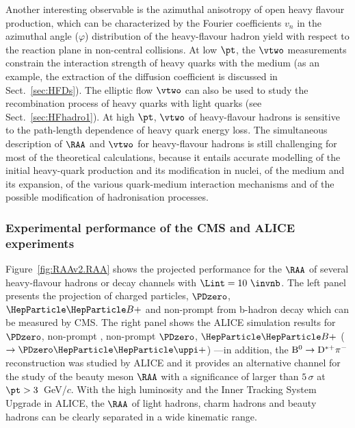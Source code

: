 Another interesting observable is the azimuthal anisotropy of open heavy flavour production, which can be characterized by the Fourier coefficients $v_n$ in the azimuthal angle ($\varphi$) distribution of the heavy-flavour hadron yield with respect to the reaction plane in non-central \PbPb collisions. At low $\pt$, the $\vtwo$ measurements constrain the interaction strength of heavy quarks with the medium (as an example, the extraction of the diffusion coefficient is discussed in Sect.~\ref{sec:HFDs}). The elliptic flow $\vtwo$ can also be used to study the recombination process of heavy quarks with light quarks (see Sect.~\ref{sec:HFhadro1}). At high $\pt$, $\vtwo$ of heavy-flavour hadrons is sensitive to the path-length dependence of heavy quark energy loss. The simultaneous description of $\RAA$ and $\vtwo$ for heavy-flavour hadrons is still challenging for most of the theoretical calculations, because it entails accurate modelling of the initial heavy-quark production and its modification in nuclei, of the medium and its expansion, of the various quark-medium interaction mechanisms and of the possible modification of hadronisation processes.


\subsubsection{Experimental performance of the CMS and ALICE experiments}
\label{sec:HFRAAv2}

Figure~\ref{fig:RAAv2.RAA} shows the projected performance for the $\RAA$ of several heavy-flavour hadrons or decay channels with $\Lint=10~\invnb$. The left panel presents the projection of charged particles, $\PDzero$, $\PBp$ and non-prompt \PJGy from b-hadron decay which can be measured by CMS. The right panel shows the ALICE simulation results for $\PDzero$, non-prompt \PJGy, non-prompt $\PDzero$, $\PBp$ ($\rightarrow \PDzero \PGpp$) 
---in addition, the $\rm B^0\rightarrow D^{*+}\pi^-$ reconstruction was studied by ALICE and it provides an alternative channel for the study of the beauty meson $\RAA$ with a significance of larger than $5\,\sigma$ at $\pt > 3$~GeV/$c$. With the high luminosity and the Inner Tracking System Upgrade in ALICE, the $\RAA$ of light hadrons, charm hadrons and beauty hadrons can be clearly separated in a wide kinematic range.

